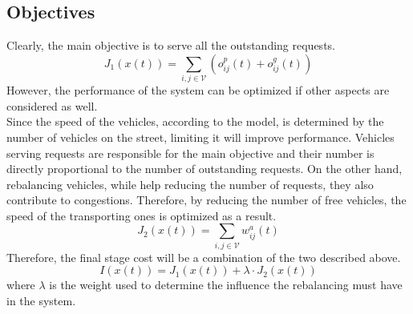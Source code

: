 \subsection{Objectives}
Clearly, the main objective is to serve all the outstanding requests. 
\begin{equation}
	J_1(x(t)) = \sum_{i,j \in \mathcal{V}}(o^p_{ij}(t) + o^g_{ij}(t))\label{eq:no_request_left}
\end{equation}
However, the performance of the system can be optimized if other aspects are considered as well.  \\
Since the speed of the vehicles, according to the model, is determined by the number of vehicles on the street, limiting it will improve performance. Vehicles serving requests are responsible for the main objective and their number is directly proportional to the number of outstanding requests. On the other hand, rebalancing vehicles, while help reducing the  number of requests, they also contribute to congestions. Therefore, by reducing the number of free vehicles, the speed of the transporting ones is optimized as a result. 
\begin{equation}
	J_2(x(t)) = \sum_{i,j \in \mathcal{V}}w^a_{ij}(t) %
\end{equation}
Therefore, the final stage cost will be a combination of the two described above. 
\begin{equation}
	I(x(t)) = J_1(x(t)) + \lambda \cdot J_2(x(t)) 
\end{equation}
where $\lambda$ is the weight used to determine the influence the rebalancing must have in the system.
